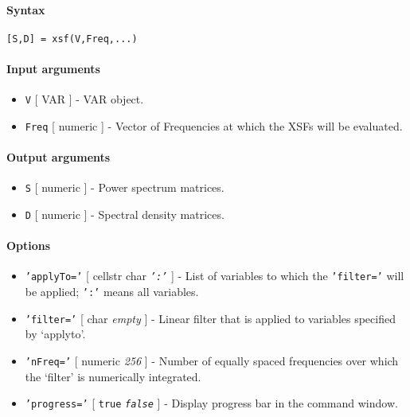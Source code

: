 


	\paragraph{Syntax}

\begin{verbatim}
[S,D] = xsf(V,Freq,...)
\end{verbatim}

\paragraph{Input arguments}

\begin{itemize}
\item
  \texttt{V} {[} VAR {]} - VAR object.
\item
  \texttt{Freq} {[} numeric {]} - Vector of Frequencies at which the
  XSFs will be evaluated.
\end{itemize}

\paragraph{Output arguments}

\begin{itemize}
\item
  \texttt{S} {[} numeric {]} - Power spectrum matrices.
\item
  \texttt{D} {[} numeric {]} - Spectral density matrices.
\end{itemize}

\paragraph{Options}

\begin{itemize}
\item
  \texttt{'applyTo='} {[} cellstr \textbar{} char \textbar{}
  \emph{\texttt{':'}} {]} - List of variables to which the
  \texttt{'filter='} will be applied; \texttt{':'} means all variables.
\item
  \texttt{'filter='} {[} char \textbar{} \emph{empty} {]} - Linear
  filter that is applied to variables specified by `applyto'.
\item
  \texttt{'nFreq='} {[} numeric \textbar{} \emph{256} {]} - Number of
  equally spaced frequencies over which the `filter' is numerically
  integrated.
\item
  \texttt{'progress='} {[} \texttt{true} \textbar{}
  \emph{\texttt{false}} {]} - Display progress bar in the command
  window.
\end{itemize}

